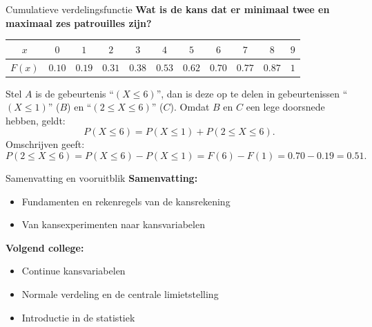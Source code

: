 \begin{frame}{Cumulatieve verdelingsfunctie}
    \textbf{Wat is de kans dat er minimaal twee en maximaal zes patrouilles zijn?}
    {\small
        \begin{center}
            \begin{tabular}{*{11}{c}}
                \toprule
                    $x$     & $0$ & $1$ & $2$ & $3$ & $4$ & $5$ & $6$ & $7$ & $8$ & $9$ \\
                \midrule
                    $F(x)$  & $0.10$ & $0.19$ & $0.31$ & $0.38$ & $0.53$ & $0.62$ & $0.70$ & $0.77$ & $0.87$ & $1$ \\
                \bottomrule
            \end{tabular}
        \end{center}
    }
    \vfill
    Stel $A$ is de gebeurtenis \enquote{$(X \leq 6)$}, dan is deze op te delen in gebeurtenissen \enquote{$(X \leq 1)$} ($B$) en \enquote{$(2 \leq X \leq 6)$} ($C$).
    \vfill\pause
    Omdat $B$ en $C$ een lege doorsnede hebben, geldt:
    \[
        P(X \leq 6) = P(X \leq 1) + P(2 \leq X \leq 6).
    \]
    \vfill\pause
    Omschrijven geeft:
    \[
        P(2 \leq X \leq 6) = P(X \leq 6) - P(X \leq 1) = F(6) - F(1) = 0.70 - 0.19 = 0.51.
    \]
\end{frame}

\begin{frame}{Samenvatting en vooruitblik}
    \textbf{Samenvatting:}
    \begin{itemize}
        \item Fundamenten en rekenregels van de kansrekening
        \item Van kansexperimenten naar kansvariabelen
    \end{itemize}
    \vfill
    \textbf{Volgend college:}
    \begin{itemize}
        \item Continue kansvariabelen
        \item Normale verdeling en de centrale limietstelling
        \item Introductie in de statistiek
    \end{itemize}
\end{frame}

